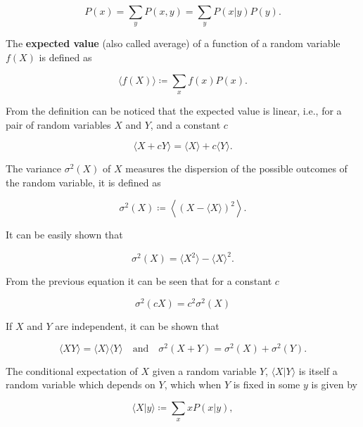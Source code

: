 \begin{equation*}
  P(x) = \sum_y P(x,y) = \sum_y P(x|y)P(y).
\end{equation*}

The \textbf{expected value} (also called average) of a function of a random variable $f(X)$ is defined as

\begin{equation}
  \label{eq:con-ave_def}
  \langle f(X)\rangle \coloneqq \sum_xf(x)P(x).
\end{equation}

From the definition can be noticed that the expected value is linear, i.e., for a pair of random variables $X$ and $Y$, and a constant $c$

\begin{equation*}
  \langle X+cY\rangle = \langle X\rangle+c\langle Y\rangle.
\end{equation*}

The variance $\sigma^2(X)$ of $X$ measures the dispersion of the possible outcomes of the random variable, it is defined as

\begin{equation*}
  \sigma^2(X) \coloneqq \left\langle\left( X-\langle X\rangle\right)^2\right\rangle.
\end{equation*}

It can be easily shown that

\begin{equation}
  \label{eq:con-var_nice}
  \sigma^2(X) = \langle X^2\rangle - \langle X\rangle^2.
\end{equation}

From the previous equation it can be seen that for a constant $c$

\begin{equation*}
  \sigma^2(cX) = c^2\sigma^2(X)
\end{equation*}

If $X$ and $Y$ are independent, it can be shown that

\begin{equation}
  \label {eq:con-mom_ind}
  \langle XY\rangle = \langle X\rangle\langle Y\rangle \quad\text{and}\quad \sigma^2(X+Y) = \sigma^2(X)+\sigma^2(Y).
\end{equation}

The conditional expectation of $X$ given a random variable $Y$, $\langle X|Y\rangle$ is itself a random variable which depends on $Y$, which when $Y$ is fixed in some $y$ is given by

\begin{equation*}
  \langle X|y\rangle \coloneqq \sum_xxP(x|y),
\end{equation*}

